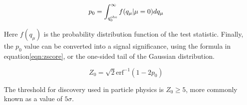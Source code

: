 \begin{equation}
p_0 = \int_{q_0^{\rm obs}}^{\infty} f(q_\mu | \mu = 0) d q_\mu
\label{eqn:pzero}
\end{equation}

Here $f(q_\mu)$ is the probability distribution function of the test statistic. Finally, the $p_0$ value can be converted into a signal significance, using the formula in equation\ref{eqn:zscore}, or the one-sided tail of the Gaussian distribution. 

\begin{equation}
Z_0 = \sqrt{2} \text{erf}^{-1} (1-2p_0)
\label{eqn:zscore}
\end{equation}

The threshold for discovery used in particle physics is $Z_0 \geq 5$, more commonly known as a value of $5\sigma$.



